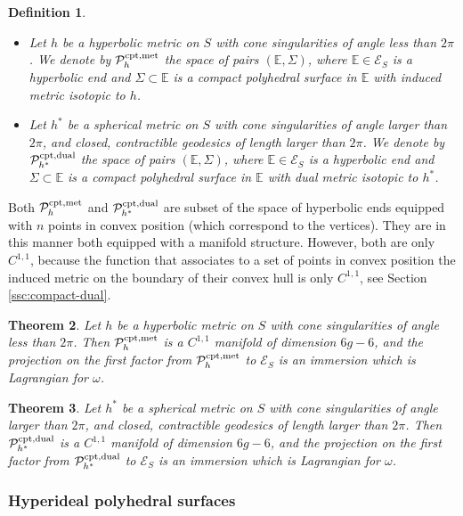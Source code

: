 \documentclass[notitlepage,twoside,a4paper]{amsart}
\newcommand{\Pcomet}{\cP^{\rm cpt,met}_{h}}
\newcommand{\Pcodua}{\cP^{\rm cpt,dual}_{h^*}}
\newtheorem{theorem}{\rm\bf Theorem}[section]
\newtheorem{definition}[theorem]{\rm\bf Definition}
\theoremstyle{named}
\newcommand{\bE}{{\mathbb E}}
\newcommand{\cE}{{\mathcal E}}
\newcommand{\cP}{{\mathcal P}}
\begin{document}
\begin{definition}
  \begin{itemize}
  \item Let $h$ be a hyperbolic metric on $S$ with cone singularities of angle less than $2\pi$.  We denote by $\Pcomet$ the space of pairs $(\bE,\Sigma)$, where $\bE\in \cE_S$ is a hyperbolic end and $\Sigma\subset \bE$ is a compact polyhedral surface in $\bE$ with induced metric isotopic to $h$.
  \item Let $h^*$ be a spherical metric on $S$ with cone singularities of angle larger than $2\pi$, and closed, contractible geodesics of length larger than $2\pi$.  We denote by $\Pcodua$ the space of pairs $(\bE,\Sigma)$, where $\bE\in \cE_S$ is a hyperbolic end and $\Sigma\subset \bE$ is a compact polyhedral surface in $\bE$ with dual metric isotopic to $h^*$.
  \end{itemize}
\end{definition}

Both $\Pcomet$ and $\Pcodua$ are subset of the space of hyperbolic ends equipped with $n$ points in convex position (which correspond to the vertices). They are in this manner both equipped with a manifold structure. However, both are only $C^{1,1}$, because the function that associates to a set of points in convex position the induced metric on the boundary of their convex hull is only $C^{1,1}$, see Section \ref{ssc:compact-dual}.

\begin{theorem} \label{tm:compact}
  Let $h$ be a hyperbolic metric on $S$ with cone singularities of angle less than $2\pi$. Then $\Pcomet$ is a $C^{1,1}$ manifold of dimension $6g-6$, and the projection on the first factor from $\Pcomet$ to $\cE_S$ is an immersion which is Lagrangian for $\omega$.
\end{theorem}

\begin{theorem} \label{tm:compact*}
  Let $h^*$ be a spherical metric on $S$ with cone singularities of angle larger than $2\pi$, and closed, contractible geodesics of length larger than $2\pi$. Then $\Pcodua$ is a $C^{1,1}$  manifold of dimension $6g-6$, and the projection on the first factor from $\Pcodua$ to $\cE_S$ is an immersion which is Lagrangian for $\omega$.
\end{theorem}

\subsubsection{Hyperideal polyhedral surfaces}
\end{document}

